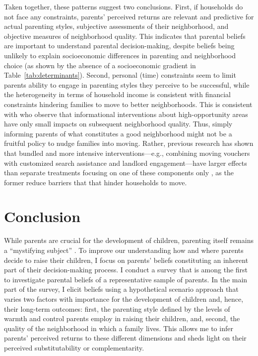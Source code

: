 \documentclass[12pt, a4paper, english]{article}
\begin{document}
Taken together, these patterns suggest two conclusions. First, if households do not face any constraints, parents' perceived returns are relevant and predictive for actual parenting styles, subjective assessments of their neighborhood, and objective measures of neighborhood quality. This indicates that parental beliefs are important to understand parental decision-making, despite beliefs being unlikely to explain socioeconomic differences in parenting and neighborhood choice (as shown by the absence of a socioeconomic gradient in Table~\ref{tab:determinants}). Second, personal (time) constraints seem to limit parents ability to engage in parenting styles they perceive to be successful, while the heterogeneity in terms of household income is consistent with financial constraints hindering families to move to better neighborhoods. This is consistent with \citet{Bergmannetal2020CMTO} who observe that informational interventions about high-opportunity areas have only small impacts on subsequent neighborhood quality. Thus, simply informing parents of what constitutes a good neighborhood might not be a fruitful policy to nudge families into moving. Rather, previous research has shown that bundled and more intensive interventions---e.g., combining moving vouchers with customized search assistance and landlord engagement---have larger effects than separate treatments focusing on one of these components only \citep{DeLucaRosenblatt2017,Schwarzetal2017,Bergmannetal2020CMTO}, as the former reduce barriers that that hinder households to move.

\section{Conclusion}\label{sec:conclusion}
While parents are crucial for the development of children, parenting itself remains a ``mystifying subject'' \citep{Bornstein2002}. To improve our understanding how and where parents decide to raise their children, I focus on parents' beliefs constituting an inherent part of their decision-making process. I conduct a survey that is among the first to investigate parental beliefs of a representative sample of parents. In the main part of the survey, I elicit beliefs using a hypothetical scenario approach that varies two factors with importance for the development of children and, hence, their long-term outcomes: first, the parenting style defined by the levels of warmth and control parents employ in raising their children, and, second, the quality of the neighborhood in which a family lives. This allows me to infer parents' perceived returns to these different dimensions and sheds light on their perceived substitutability or complementarity. 
\end{document}
